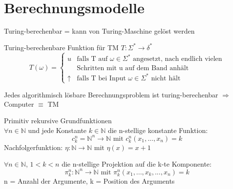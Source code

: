 \graphicspath{{images/}}

\section*{Berechnungsmodelle}

\begin{definition}{Turing-berechenbar} = kann von Turing-Maschine gelöst werden
    
    Turing-berechenbare Funktion für TM $T: \Sigma^* \rightarrow \delta^*$
    $$T(\omega) = \begin{cases}
        u & \text{falls T auf } \omega \in \Sigma^* \text{ angesetzt, nach endlich vielen}\\ 
        &\text{Schritten mit u auf dem Band anhält}\\
        \uparrow & \text{falls T bei Input } \omega \in \Sigma^* \text{ nicht hält}
    \end{cases}$$
\end{definition}

\begin{remark}
    Jedes algorithmisch lösbare Berechnungsproblem ist turing-berechenbar $\Rightarrow$ Computer $\equiv$ TM
\end{remark}

\begin{theorem}{Primitiv rekursive Grundfunktionen}\\
    $\forall n \in \mathbb{N}$ und jede Konstante $k \in \mathbb{N}$ die n-stellige konstante Funktion:
    $$c_k^n = \mathbb{N}^n \rightarrow \mathbb{N} \text{ mit } c_k^n (x_1, ... , x_n) = k$$
    Nachfolgerfunktion: $\eta : \mathbb{N} \rightarrow \mathbb{N} \text{ mit } \eta (x) = x + 1$

    \vspace{1mm}
    
    $\forall n \in \mathbb{N}$, $1 < k < n$ die n-stellige Projektion auf die k-te Komponente:
    $$\pi_k^n : \mathbb{N}^n \rightarrow \mathbb{N} \text{ mit } \pi_k^n (x_1, ... ,x_k,..., x_n) = k$$
    n = Anzahl der Argumente, k = Position des Arguments
\end{theorem}

